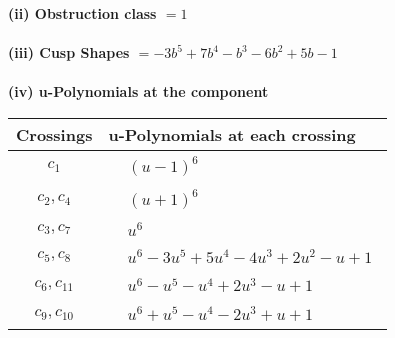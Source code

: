 \documentclass[1p]{elsarticle_modified}
\theoremstyle{definition}
\begin{document}
\flushleft \textbf{(ii) Obstruction class $= 1$}\\~\\
\flushleft \textbf{(iii) Cusp Shapes $= -3 b^5+7 b^4- b^3-6 b^2+5 b-1$}\\~\\
\newpage\renewcommand{\arraystretch}{1}
\flushleft \textbf{(iv) u-Polynomials at the component}\newline \\
\begin{tabular}{m{50pt}|m{274pt}}
Crossings & \hspace{64pt}u-Polynomials at each crossing \\
\hline $$\begin{aligned}c_{1}\end{aligned}$$&$\begin{aligned}
&(u-1)^6
\end{aligned}$\\
\hline $$\begin{aligned}c_{2},c_{4}\end{aligned}$$&$\begin{aligned}
&(u+1)^6
\end{aligned}$\\
\hline $$\begin{aligned}c_{3},c_{7}\end{aligned}$$&$\begin{aligned}
&u^6
\end{aligned}$\\
\hline $$\begin{aligned}c_{5},c_{8}\end{aligned}$$&$\begin{aligned}
&u^6-3 u^5+5 u^4-4 u^3+2 u^2- u+1
\end{aligned}$\\
\hline $$\begin{aligned}c_{6},c_{11}\end{aligned}$$&$\begin{aligned}
&u^6- u^5- u^4+2 u^3- u+1
\end{aligned}$\\
\hline $$\begin{aligned}c_{9},c_{10}\end{aligned}$$&$\begin{aligned}
&u^6+u^5- u^4-2 u^3+u+1
\end{aligned}$\\
\hline
\end{tabular}\\~\\
\end{document}
